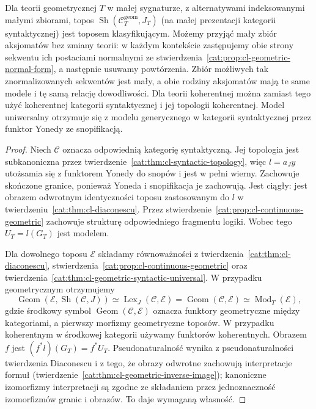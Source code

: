 \begin{twierdzenie}\label{cat:thm:cl-classifying-existence}
Dla teorii geometrycznej $T$ w małej sygnaturze, z alternatywami indeksowanymi małymi zbiorami, topos $\operatorname{Sh}(\mathcal C_T^{\mathrm{geom}},J_T)$ (na małej prezentacji kategorii syntaktycznej) jest toposem klasyfikującym. Możemy przyjąć mały zbiór aksjomatów bez zmiany teorii: w każdym kontekście zastępujemy obie strony sekwentu ich postaciami normalnymi ze stwierdzenia~\ref{cat:prop:cl-geometric-normal-form}, a następnie usuwamy powtórzenia. Zbiór możliwych tak znormalizowanych sekwentów jest mały, a obie rodziny aksjomatów mają te same modele i tę samą relację dowodliwości. Dla teorii koherentnej można zamiast tego użyć koherentnej kategorii syntaktycznej i jej topologii koherentnej. Model uniwersalny otrzymuje się z modelu generycznego w kategorii syntaktycznej przez funktor Yonedy ze snopifikacją.
\end{twierdzenie}
\begin{proof}
Niech $\mathcal C$ oznacza odpowiednią kategorię syntaktyczną. Jej topologia jest subkanoniczna przez twierdzenie~\ref{cat:thm:cl-syntactic-topology}, więc $l=a_Jy$ utożsamia się z funktorem Yonedy do snopów i jest w pełni wierny. Zachowuje skończone granice, ponieważ Yoneda i snopifikacja je zachowują. Jest ciągły: jest obrazem odwrotnym identyczności toposu zastosowanym do $l$ w twierdzeniu~\ref{cat:thm:cl-diaconescu}. Przez stwierdzenie~\ref{cat:prop:cl-continuous-geometric} zachowuje strukturę odpowiedniego fragmentu logiki. Wobec tego $U_T=l(G_T)$ jest modelem.

Dla dowolnego toposu $\mathcal E$ składamy równoważności z twierdzenia~\ref{cat:thm:cl-diaconescu}, stwierdzenia~\ref{cat:prop:cl-continuous-geometric} oraz twierdzenia~\ref{cat:thm:cl-geometric-syntactic-universal}. W przypadku geometrycznym otrzymujemy
\[
 \operatorname{Geom}(\mathcal E,\operatorname{Sh}(\mathcal C,J))
 \simeq\operatorname{Lex}_J(\mathcal C,\mathcal E)
 =\operatorname{Geom}(\mathcal C,\mathcal E)
 \simeq\operatorname{Mod}_T(\mathcal E),
\]
gdzie środkowy symbol $\operatorname{Geom}(\mathcal C,\mathcal E)$ oznacza funktory geometryczne między kategoriami, a pierwszy morfizmy geometryczne toposów. W przypadku koherentnym w środkowej kategorii używamy funktorów koherentnych. Obrazem $f$ jest $(f^*l)(G_T)=f^*U_T$. Pseudonaturalność wynika z pseudonaturalności twierdzenia Diaconescu i z tego, że obrazy odwrotne zachowują interpretacje formuł (twierdzenie~\ref{cat:thm:cl-geometric-inverse-image}); kanoniczne izomorfizmy interpretacji są zgodne ze składaniem przez jednoznaczność izomorfizmów granic i obrazów. To daje wymaganą własność.
\end{proof}

